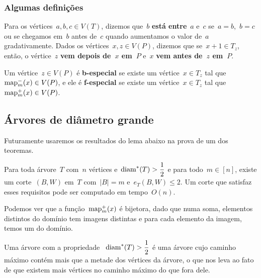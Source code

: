 	\bigskip
	\bigskip

	\subsubsection*{Algumas definições}

	Para os vértices~${a,b,c\in V(T)}$, dizemos que~$b$
	\textbf{está entre}~$a$ e~$c$ se~${a=b}$,~${b=c}$ 
	ou se chegamos em~$b$ antes
	de~$c$ quando aumentamos o valor de~$a$  
	gradativamente.
	Dados os vértices~${x,z\in V(P)}$, dizemos que 
	se~${x+1\in T_z}$, então, o
	vértice~$z$ \textbf{vem depois de~$x$ em~$P$} 
	e~$x$ \textbf{vem antes de~$z$ em~$P$}.


	Um vértice~${z\in V(P)}$ é \textbf{b-especial}
	se existe um vértice~${x\in T_z}$ tal 
	que~${\mathrm{map}^{-}_m(x)\in V(P)}$, e ele é
	\textbf{f-especial} se existe um vértice~${x\in T_z}$
	tal que~${\mathrm{map}^{+}_m(x)\in V(P)}$.

	\bigskip
	\bigskip
	\bigskip
	\bigskip



	\subsection{Árvores de diâmetro grande}

	Futuramente usaremos os resultados do lema abaixo na prova de 
	um dos teoremas.

	\begin{lem}
	\label{lema:caminhoLongo}
		Para toda árvore~$T$ com~$n$ 
		vértices e~${\mathrm{diam}^*(T)>\dfrac{1}{2}}$
		e para todo~${m\in[n]}$, existe um corte~$(B,W)$ em~$T$
		com~${|B|=m}$ e~${e_T(B,W)\le 2}$. Um corte que satisfaz esses
		requisitos pode ser computado em tempo~$O(n)$.
	\end{lem}

	\medskip
	\medskip

	Podemos ver que a função~$\mathrm{map}^+_m(x)$ é bijetora, dado que numa
	soma, elementos distintos do domínio tem imagens distintas e 
	para cada elemento da imagem, temos um do domínio.

	Uma árvore com a propriedade ~${\mathrm{diam}^*(T)>\dfrac{1}{2}}$ é uma
	árvore cujo caminho máximo contém mais que a metade dos 
	vértices da árvore, o que nos leva ao fato de que existem mais 
	vértices no caminho máximo do que fora dele. 

